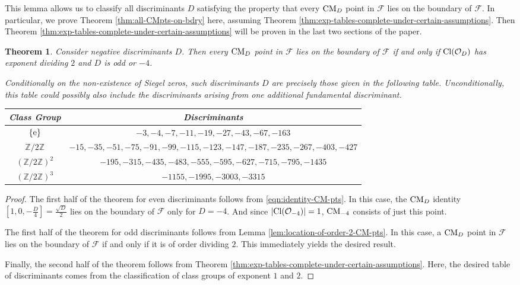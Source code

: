 \documentclass[11pt,letterpaper,reqno]{amsart}
\renewcommand{\arraystretch}{1}
\newtheorem{theorem}{Theorem}[section]
\numberwithin{equation}{section}
\numberwithin{figure}{section}
\numberwithin{table}{section}
\newcommand{\ZZ}{\mathbb{Z}}
\newcommand{\FF}{\mathcal{F}}
\newcommand{\CM}{\textnormal{CM}}
\newcommand{\Cl}[1]{\textnormal{Cl}(\mathcal{O}_{#1})}
\begin{document}
This lemma allows us to classify all discriminants $D$ satisfying the property that every $\CM_D$ point in $\FF$ lies on the boundary of $\FF$. In particular, we prove Theorem \ref{thm:all-CMpts-on-bdry} here, assuming Theorem \ref{thm:exp-tables-complete-under-certain-assumptions}. Then Theorem \ref{thm:exp-tables-complete-under-certain-assumptions} will be proven in the last two sections of the paper. 

{
\renewcommand{\thetheorem}{\ref{thm:all-CMpts-on-bdry}}
\begin{theorem}
    Consider negative discriminants $D$. Then every $\CM_D$ point in $\FF$ lies on the boundary of $\FF$ if and only if $\Cl{D}$ has exponent dividing $2$ and $D$ is odd or $-4$.

    Conditionally on the non-existence of Siegel zeros, such discriminants $D$ are precisely those given in the following table. Unconditionally, this table could possibly also include the discriminants arising from one additional fundamental discriminant.

    {
    \centering
    \def\arraystretch{1.4}
    \begin{tabular}{ c | c } 
         Class Group & Discriminants \\ 
         \hline
         $\textnormal{\{e\}}$ &  $-3, -4, -7, -11, -19, -27, -43, -67, -163$\\  
         $\ZZ/2\ZZ$ &  $-15, -35, -51, -75, -91, -99, -115, -123, -147, -187, -235, -267, -403, -427$\\  
         $(\ZZ/2\ZZ)^2$ & $-195, -315, -435, -483, -555, -595, -627, -715, -795, -1435$ \\  
         $(\ZZ/2\ZZ)^3$ & $-1155, -1995, -3003, -3315$ \\
    \end{tabular}
    }
\end{theorem}
\addtocounter{theorem}{-1}
}

\begin{proof}   
    The first half of the theorem for even discriminants follows from \eqref{eqn:identity-CM-pts}. In this case, the $\CM_D$ identity $[1, 0, -\frac{D}{4}] = \frac{\sqrt{D}}{2}$ lies on the boundary of $\FF$ only for $D=-4$. And since $|\Cl{-4}| = 1$, $\CM_{-4}$ consists of just this point.

    The first half of the theorem for odd discriminants follows from Lemma \ref{lem:location-of-order-2-CM-pts}. In this case, a $\CM_D$ point in $\FF$ lies on the boundary of $\FF$ if and only if it is of order dividing $2$. This immediately yields the desired result. 

    Finally, the second half of the theorem follows from Theorem \ref{thm:exp-tables-complete-under-certain-assumptions}. Here, the desired table of discriminants comes from the classification of class groups of exponent $1$ and $2$.
\end{proof}
\end{document}
